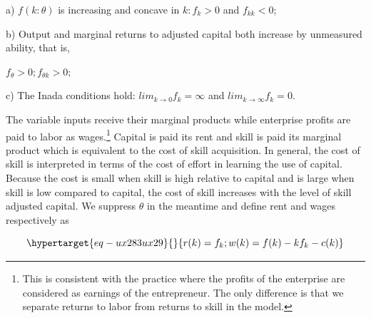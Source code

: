 \documentclass[
  a4paper,
  DIV=11,
  numbers=noendperiod]{scrartcl}
\begin{document}
a) \(f(k:\theta)\) is increasing and concave in \(k:f_k>0\) and
\(f_{kk}<0;\)

b) Output and marginal returns to adjusted capital both increase by
unmeasured ability, that is,

\(f_\theta >0; f_{\theta k}>0;\)

c) The Inada conditions hold: \(lim_{{k\to0}} f_k =\infty\) and
\(lim_{{k\to\infty}} f_k=0.\)

The variable inputs receive their marginal products while enterprise
profits are paid to labor as wages.\footnote{This is consistent with the
  practice where the profits of the enterprise are considered as
  earnings of the entrepreneur. The only difference is that we separate
  returns to labor from returns to skill in the model.} Capital is paid
its rent and skill is paid its marginal product which is equivalent to
the cost of skill acquisition. In general, the cost of skill is
interpreted in terms of the cost of effort in learning the use of
capital. Because the cost is small when skill is high relative to
capital and is large when skill is low compared to capital, the cost of
skill increases with the level of skill adjusted capital. We suppress
\(\theta\) in the meantime and define rent and wages respectively as

\begin{equation}\protect\hypertarget{eq-ux283ux29}{}{
r(k)=f_k;w(k)=f(k)-kf_k-c(k)
}\label{eq-(3)}\end{equation}
\end{document}
